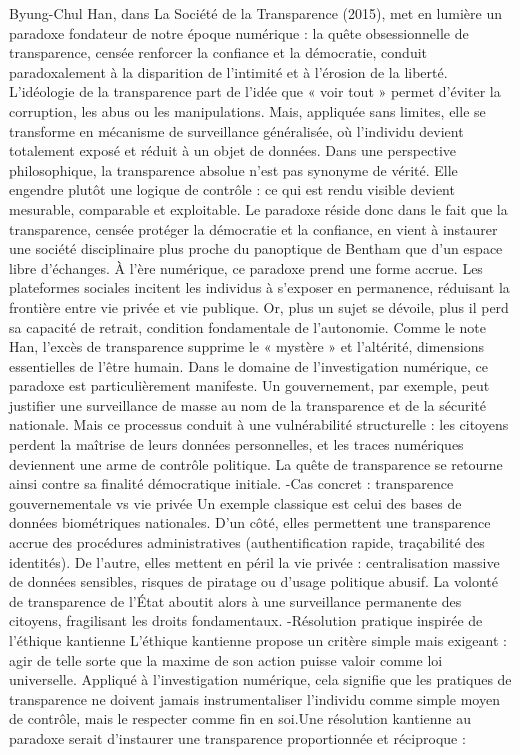 \documentclass[]{article}
\begin{document}
Byung-Chul Han, dans La Société de la Transparence (2015), met en lumière un paradoxe fondateur de notre époque numérique : la quête obsessionnelle de transparence, censée renforcer la confiance et la démocratie, conduit paradoxalement à la disparition de l’intimité et à l’érosion de la liberté. L’idéologie de la transparence part de l’idée que « voir tout » permet d’éviter la corruption, les abus ou les manipulations. Mais, appliquée sans limites, elle se transforme en mécanisme de surveillance généralisée, où l’individu devient totalement exposé et réduit à un objet de données.
Dans une perspective philosophique, la transparence absolue n’est pas synonyme de vérité. Elle engendre plutôt une logique de contrôle : ce qui est rendu visible devient mesurable, comparable et exploitable. Le paradoxe réside donc dans le fait que la transparence, censée protéger la démocratie et la confiance, en vient à instaurer une société disciplinaire plus proche du panoptique de Bentham que d’un espace libre d’échanges.
À l’ère numérique, ce paradoxe prend une forme accrue. Les plateformes sociales incitent les individus à s’exposer en permanence, réduisant la frontière entre vie privée et vie publique. Or, plus un sujet se dévoile, plus il perd sa capacité de retrait, condition fondamentale de l’autonomie. Comme le note Han, l’excès de transparence supprime le « mystère » et l’altérité, dimensions essentielles de l’être humain.
Dans le domaine de l’investigation numérique, ce paradoxe est particulièrement manifeste. Un gouvernement, par exemple, peut justifier une surveillance de masse au nom de la transparence et de la sécurité nationale. Mais ce processus conduit à une vulnérabilité structurelle : les citoyens perdent la maîtrise de leurs données personnelles, et les traces numériques deviennent une arme de contrôle politique. La quête de transparence se retourne ainsi contre sa finalité démocratique initiale.
-Cas concret : transparence gouvernementale vs vie privée
Un exemple classique est celui des bases de données biométriques nationales. D’un côté, elles permettent une transparence accrue des procédures administratives (authentification rapide, traçabilité des identités). De l’autre, elles mettent en péril la vie privée : centralisation massive de données sensibles, risques de piratage ou d’usage politique abusif. La volonté de transparence de l’État aboutit alors à une surveillance permanente des citoyens, fragilisant les droits fondamentaux.
-Résolution pratique inspirée de l’éthique kantienne
L’éthique kantienne propose un critère simple mais exigeant : agir de telle sorte que la maxime de son action puisse valoir comme loi universelle. Appliqué à l’investigation numérique, cela signifie que les pratiques de transparence ne doivent jamais instrumentaliser l’individu comme simple moyen de contrôle, mais le respecter comme fin en soi.Une résolution kantienne au paradoxe serait d’instaurer une transparence proportionnée et réciproque :
\end{document}
